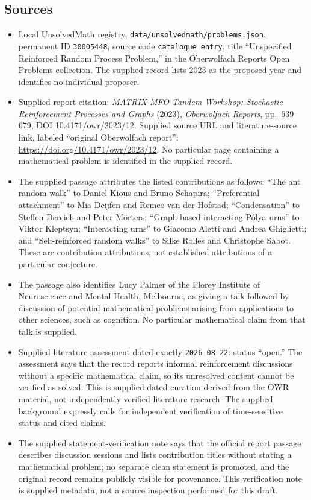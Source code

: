 \documentclass[11pt]{article}
\begin{document}
\subsection{Sources}
\begin{itemize}
\item Local UnsolvedMath registry, \texttt{data/unsolvedmath/problems.json}, permanent ID \texttt{30005448}, source code \texttt{catalogue entry}, title ``Unspecified Reinforced Random Process Problem,'' in the Oberwolfach Reports Open Problems collection. The supplied record lists 2023 as the proposed year and identifies no individual proposer.
\item Supplied report citation: \emph{MATRIX-MFO Tandem Workshop: Stochastic Reinforcement Processes and Graphs} (2023), \emph{Oberwolfach Reports}, pp.~639--679, DOI 10.4171/owr/2023/12. Supplied source URL and literature-source link, labeled ``original Oberwolfach report'': \url{https://doi.org/10.4171/owr/2023/12}. No particular page containing a mathematical problem is identified in the supplied record.
\item The supplied passage attributes the listed contributions as follows: ``The ant random walk'' to Daniel Kious and Bruno Schapira; ``Preferential attachment'' to Mia Deijfen and Remco van der Hofstad; ``Condensation'' to Steffen Dereich and Peter M\"orters; ``Graph-based interacting P\'olya urns'' to Viktor Kleptsyn; ``Interacting urns'' to Giacomo Aletti and Andrea Ghiglietti; and ``Self-reinforced random walks'' to Silke Rolles and Christophe Sabot. These are contribution attributions, not established attributions of a particular conjecture.
\item The passage also identifies Lucy Palmer of the Florey Institute of Neuroscience and Mental Health, Melbourne, as giving a talk followed by discussion of potential mathematical problems arising from applications to other sciences, such as cognition. No particular mathematical claim from that talk is supplied.
\item Supplied literature assessment dated exactly \texttt{2026-08-22}: status ``open.'' The assessment says that the record reports informal reinforcement discussions without a specific mathematical claim, so its unresolved content cannot be verified as solved. This is supplied dated curation derived from the OWR material, not independently verified literature research. The supplied background expressly calls for independent verification of time-sensitive status and cited claims.
\item The supplied statement-verification note says that the official report passage describes discussion sessions and lists contribution titles without stating a mathematical problem; no separate clean statement is promoted, and the original record remains publicly visible for provenance. This verification note is supplied metadata, not a source inspection performed for this draft.
\end{itemize}
\end{document}
